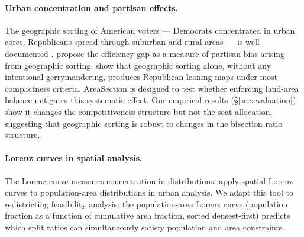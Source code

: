 \paragraph{Urban concentration and partisan effects.}
The geographic sorting of American voters --- Democrats concentrated in urban
cores, Republicans spread through suburban and rural areas --- is well
documented \citep{rodden2019,chen2013}.
\citet{stephanopoulos2015} propose the efficiency gap as a measure of partisan
bias arising from geographic sorting.
\citet{mcghee2014} show that geographic sorting alone, without any intentional
gerrymandering, produces Republican-leaning maps under most compactness
criteria.
AreaSection is designed to test whether enforcing land-area balance
mitigates this systematic effect.
Our empirical results (\S\ref{sec:evaluation}) show it changes the
competitiveness structure but not the seat allocation, suggesting that
geographic sorting is robust to changes in the bisection ratio structure.

\paragraph{Lorenz curves in spatial analysis.}
The Lorenz curve \citep{lorenz1905} measures concentration in distributions.
\citet{frank2010} apply spatial Lorenz curves to population-area distributions
in urban analysis.
We adapt this tool to redistricting feasibility analysis: the population-area
Lorenz curve (population fraction as a function of cumulative area fraction,
sorted densest-first) predicts which split ratios can simultaneously satisfy
population and area constraints.
